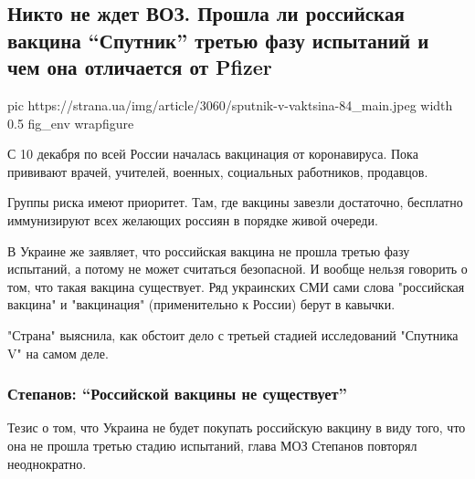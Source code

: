  
 
 
 
 
 
\subsection{Никто не ждет ВОЗ. Прошла ли российская вакцина \enquote{Спутник} третью фазу испытаний и чем она отличается от Pfizer}
\label{sec:15_12_2020.news.ua.strana.1.nikto_ne_zhdet_voz}

\ifcmt
  pic https://strana.ua/img/article/3060/sputnik-v-vaktsina-84_main.jpeg
  width 0.5
  fig_env wrapfigure
\fi


С 10 декабря по всей России началась вакцинация от коронавируса. Пока прививают
врачей, учителей, военных, социальных работников, продавцов. 

Группы риска имеют приоритет. Там, где вакцины завезли достаточно, бесплатно
иммунизируют всех желающих россиян в порядке живой очереди. 

В Украине же заявляет, что российская вакцина не прошла третью фазу испытаний,
а потому не может считаться безопасной. И вообще нельзя говорить о том, что
такая вакцина существует. Ряд украинских СМИ сами слова "российская вакцина" и
"вакцинация" (применительно к России) берут в кавычки. 

"Страна" выяснила, как обстоит дело с третьей стадией исследований "Спутника V"
на самом деле. 

\subsubsection{Степанов: \enquote{Российской вакцины не существует} }

Тезис о том, что Украина не будет покупать российскую вакцину в виду того, что
она не прошла третью стадию испытаний, глава МОЗ Степанов повторял
неоднократно.

